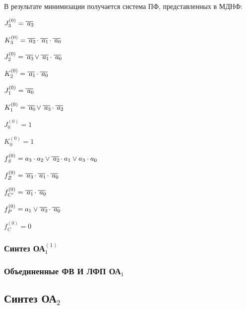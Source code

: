

В результате минимизации получается система ПФ, представленных в МДНФ:

$J^{(0)}_{3} = \oline{a_2}$

$K^{(0)}_{3} = \oline{a_2} \cdot \oline{a_1} \cdot \oline{a_0}$

$J^{(0)}_{2} = \oline{a_3} \vee \oline{a_1} \cdot \oline{a_0}$

$K^{(0)}_{2} = \oline{a_1} \cdot \oline{a_0}$

$J^{(0)}_{1} = \oline{a_0}$

$K^{(0)}_{1} = \oline{a_0} \vee \oline{a_3} \cdot \oline{a_2}$

$J^{(0)}_{0} = 1$

$K^{(0)}_{0} = 1$

$f^{(0)}_{S} = a_3 \cdot a_2 \vee \oline{a_2} \cdot a_1 \vee a_3 \cdot a_0 $

$f^{(0)}_{Z} = \oline{a_3} \cdot \oline{a_1} \cdot \oline{a_0}$

$f^{(0)}_{C'} = \oline{a_1} \cdot \oline{a_0}$

$f^{(0)}_{P} = a_1 \vee \oline{a_3} \cdot \oline{a_0}$

$f^{(0)}_{C} = 0$


\subsubsection{Синтез ОА$^{(1)}_{1}$}



\subsubsection{Объединенные ФВ И ЛФП ОА${}_1$}

\subsection{Синтез ОА${}_2$}
